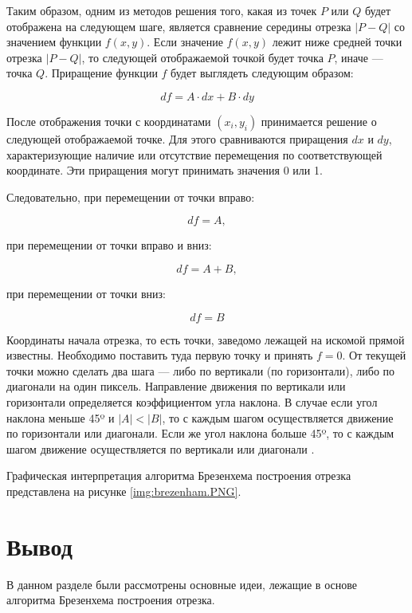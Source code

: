 Таким образом, одним из методов решения того, какая из точек $P$ или $Q$ будет отображена на следующем шаге, является сравнение середины отрезка $|P-Q|$ со значением функции $f(x,y)$. Если значение $f(x,y)$ лежит ниже средней точки отрезка $|P-Q|$, то следующей отображаемой точкой будет точка $P$, иначе — точка $Q$.
Приращение функции $f$ будет выглядеть следующим образом:

\begin{equation}
	df=A \cdot dx+B \cdot dy
\end{equation}

После отображения точки с координатами $(x_{i},y_{i})$ принимается решение о следующей отображаемой точке. Для этого сравниваются приращения $dx$ и $dy$, характеризующие наличие или отсутствие перемещения по соответствующей координате. Эти приращения могут принимать значения 0 или 1. 

Следовательно, при перемещении от точки вправо:

\begin{equation}
	df=A,
\end{equation}

при перемещении от точки вправо и вниз:

\begin{equation}
	df=A + B,
\end{equation}

при перемещении от точки вниз:

\begin{equation}
	df=B
\end{equation}

Координаты начала отрезка, то есть точки, заведомо лежащей на искомой прямой известны. Необходимо поставить туда первую точку и принять $f = 0$. От текущей точки можно сделать два шага — либо по вертикали (по горизонтали), либо по диагонали на один пиксель.
Направление движения по вертикали или горизонтали определяется коэффициентом угла наклона. В случае если угол наклона меньше 45º и $|A|<|B|$, то с каждым шагом осуществляется движение по горизонтали или диагонали.
Если же угол наклона больше 45º, то с каждым шагом движение осуществляется по вертикали или диагонали \cite{brez_alg}.

Графическая интерпретация алгоритма Брезенхема построения отрезка представлена на рисунке \ref{img:brezenham.PNG}.

\section*{Вывод}
В данном разделе были рассмотрены основные идеи, лежащие в основе алгоритма Брезенхема построения отрезка.